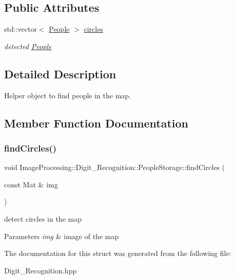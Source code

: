 \subsection*{Public Attributes}
\begin{DoxyCompactItemize}
\item 
\mbox{\label{struct_image_processing_1_1_digit___recognition_1_1_people_storage_ac67efa745ccd443d7a090f22c83763d8}} 
std\+::vector$<$ \mbox{\hyperlink{class_people}{People}} $>$ \mbox{\hyperlink{struct_image_processing_1_1_digit___recognition_1_1_people_storage_ac67efa745ccd443d7a090f22c83763d8}{circles}}
\begin{DoxyCompactList}\small\item\em detected \mbox{\hyperlink{class_people}{People}} \end{DoxyCompactList}\end{DoxyCompactItemize}


\subsection{Detailed Description}
Helper object to find people in the map. 

\subsection{Member Function Documentation}
\mbox{\label{struct_image_processing_1_1_digit___recognition_1_1_people_storage_abf497a9ec4f06a14df057e6b94066ed2}} 
\subsubsection{\texorpdfstring{find\+Circles()}{findCircles()}}
{\footnotesize\ttfamily void Image\+Processing\+::\+Digit\+\_\+\+Recognition\+::\+People\+Storage\+::find\+Circles (\begin{DoxyParamCaption}\item[{const Mat \&}]{img }\end{DoxyParamCaption})\hspace{0.3cm}{\ttfamily [inline]}}

detect circles in the map 
\begin{DoxyParams}{Parameters}
{\em img} & image of the map \\
\hline
\end{DoxyParams}


The documentation for this struct was generated from the following file\+:\begin{DoxyCompactItemize}
\item 
Digit\+\_\+\+Recognition.\+hpp\end{DoxyCompactItemize}
